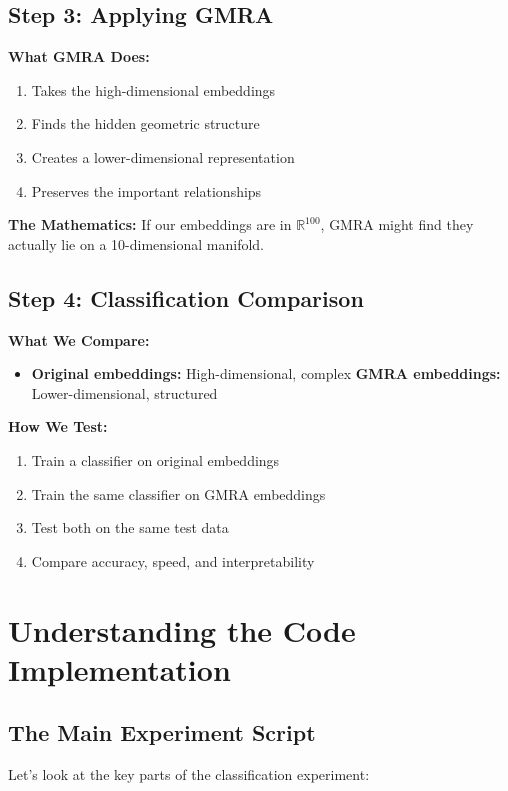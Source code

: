 \documentclass[12pt]{article}
\begin{document}
\subsection{Step 3: Applying GMRA}

\textbf{What GMRA Does:}
\begin{enumerate}
    \item Takes the high-dimensional embeddings
    \item Finds the hidden geometric structure
    \item Creates a lower-dimensional representation
    \item Preserves the important relationships
\end{enumerate}

\textbf{The Mathematics:} If our embeddings are in $\mathbb{R}^{100}$, GMRA might find they actually lie on a 10-dimensional manifold.

\subsection{Step 4: Classification Comparison}

\textbf{What We Compare:}
\begin{itemize}
    \item \textbf{Original embeddings:} High-dimensional, complex
    \textbf{GMRA embeddings:} Lower-dimensional, structured
\end{itemize}

\textbf{How We Test:}
\begin{enumerate}
    \item Train a classifier on original embeddings
    \item Train the same classifier on GMRA embeddings
    \item Test both on the same test data
    \item Compare accuracy, speed, and interpretability
\end{enumerate}

\section{Understanding the Code Implementation}

\subsection{The Main Experiment Script}

Let's look at the key parts of the classification experiment:
\end{document}
